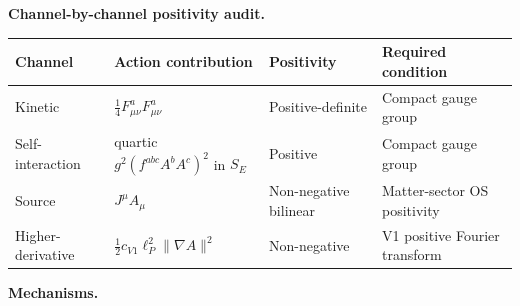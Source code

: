 \documentclass[
  11pt,a4paper]{article}
\newcounter{none} %
\begin{document}
\textbf{Channel-by-channel positivity audit.}

{\def\LTcaptype{none} %
\begin{longtable}[]{@{}
  >{\raggedright\arraybackslash}p{}
  >{\raggedright\arraybackslash}p{}
  >{\raggedright\arraybackslash}p{}
  >{\raggedright\arraybackslash}p{}@{}}
\toprule\noalign{}
\begin{minipage}[b]{\linewidth}\raggedright
Channel
\end{minipage} & \begin{minipage}[b]{\linewidth}\raggedright
Action contribution
\end{minipage} & \begin{minipage}[b]{\linewidth}\raggedright
Positivity
\end{minipage} & \begin{minipage}[b]{\linewidth}\raggedright
Required condition
\end{minipage} \\
\midrule\noalign{}
\endhead
\bottomrule\noalign{}
\endlastfoot
Kinetic & \(\tfrac{1}{4}F_{\mu\nu}^a F_{\mu\nu}^a\) & Positive-definite
& Compact gauge group \\
Self-interaction & quartic \(g^2(f^{abc}A^bA^c)^2\) in \(S_E\) &
Positive & Compact gauge group \\
Source & \(J^\mu A_\mu\) & Non-negative bilinear & Matter-sector OS
positivity \\
Higher-derivative & \(\tfrac{1}{2}c_{V1}\ell_P^2\|\nabla A\|^2\) &
Non-negative & V1 positive Fourier transform \\
\end{longtable}
}

\textbf{Mechanisms.}
\end{document}

